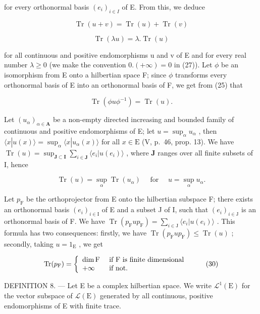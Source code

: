 for every orthonormal basis \((e_{i})_{i\in I}\) of E. From this, we deduce

\[
\operatorname{Tr} (u + v) = \operatorname{Tr} (u) + \operatorname{Tr} (v)\tag{26}
\]

\[
\operatorname{Tr} (\lambda u) = \lambda . \operatorname{Tr} (u)\tag{27}
\]

for all continuous and positive endomorphisms u and v of E and for every real number \(\lambda \geqslant 0\) (we make the convention \(0. (+\infty) = 0\) in (27)). Let \(\phi\) be an isomorphism from E onto a hilbertian space F; since \(\phi\) transforms every orthonormal basis of E into an orthonormal basis of F, we get from (25) that

\[
\operatorname{Tr} \left(\phi u \phi^ {- 1}\right) = \operatorname{Tr} (u).\tag{28}
\]

Let \((u_{\alpha})_{\alpha \in \mathbf{A}}\) be a non-empty directed increasing and bounded family of continuous and positive endomorphisms of E; let \(u = \sup_{\alpha} u_{\alpha}\) , then \(\langle x|u(x) \rangle = \sup_{\alpha} \langle x|u_{\alpha}(x) \rangle\) for all \(x \in \mathrm{E}\) (V, p.~46, prop. 13). We have \(\operatorname{Tr}(u) = \sup_{\mathbf{J} \subset \mathbf{I}} \sum_{i \in \mathbf{J}} \langle e_i | u(e_i) \rangle\) , where \(\mathbf{J}\) ranges over all finite subsets of I, hence

\[
\operatorname{Tr} (u) = \sup _ {\alpha} \operatorname{Tr} (u _ {\alpha}) \quad \text { for } \quad u = \sup _ {\alpha} u _ {\alpha}.\tag{29}
\]

Let \(p_{\mathrm{F}}\) be the orthoprojector from E onto the hilbertian subspace F; there exists an orthonormal basis \((e_i)_{i \in \mathrm{I}}\) of E and a subset J of I, such that \((e_i)_{i \in \mathrm{J}}\) is an orthonormal basis of F. We have \(\operatorname{Tr}(p_{\mathrm{F}} up_{\mathrm{F}}) = \sum_{i \in \mathrm{J}} \langle e_i | u(e_i) \rangle\) . This formula has two consequences: firstly, we have \(\operatorname{Tr}(p_{\mathrm{F}} up_{\mathrm{F}}) \leqslant \operatorname{Tr}(u)\) ; secondly, taking \(u = 1_{\mathrm{E}}\) , we get

\[
\operatorname{Tr} (p _ {\mathrm{F}}) = \left\{ \begin{array}{l l} \dim \mathrm{F} & \text { if   F   is   finite   dimensional } \\ + \infty & \text { if   not. } \end{array} \right.\tag{30}
\]

DEFINITION 8. --- Let E be a complex hilbertian space. We write \(\mathcal{L}^{1}(\mathrm{E})\) for the vector subspace of \(\mathcal{L}(\mathrm{E})\) generated by all continuous, positive endomorphisms of E with finite trace.

